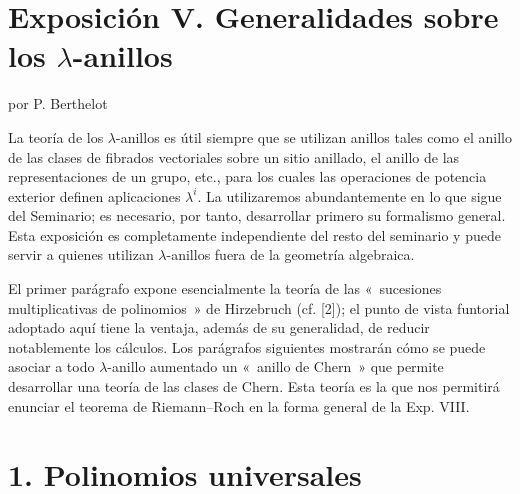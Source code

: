 \providecommand{\sisi}[2]{#2}

\section*{Exposición V. Generalidades sobre los \(\lambda\)-anillos}
\begin{center}
por P. Berthelot
\end{center}

La teoría de los \(\lambda\)-anillos es útil siempre que se utilizan anillos tales como el anillo de las clases de fibrados vectoriales sobre un sitio anillado, el anillo de las representaciones de un grupo, etc., para los cuales las operaciones de potencia exterior definen aplicaciones \(\lambda^i\). La utilizaremos abundantemente en lo que sigue del Seminario; es necesario, por tanto, desarrollar primero su formalismo general. Esta exposición es completamente independiente del resto del seminario y puede servir a quienes utilizan \(\lambda\)-anillos fuera de la geometría algebraica.

El primer parágrafo expone esencialmente la teoría de las «~sucesiones multiplicativas de polinomios~» de Hirzebruch (cf. [2]); el punto de vista funtorial adoptado aquí tiene la ventaja, además de su generalidad, de reducir notablemente los cálculos. Los parágrafos siguientes mostrarán cómo se puede asociar a todo \(\lambda\)-anillo aumentado un «~anillo de Chern~» que permite desarrollar una teoría de las clases de Chern. Esta teoría es la que nos permitirá enunciar el teorema de Riemann--Roch en la forma general de la Exp. VIII.

\section*{1. Polinomios universales}

